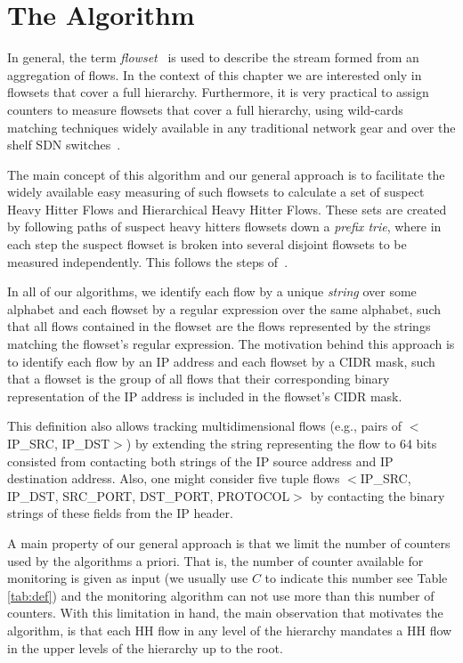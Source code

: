 \section{The \simpleAlgo Algorithm}

In general, the term \textit{flowset}~\cite{conf/sigcomm/YuanCM07} is used to describe the stream formed from an aggregation of flows.
In the context of this chapter we are interested only in flowsets that cover a full hierarchy.
Furthermore, it is very practical to assign counters to measure flowsets that cover a full hierarchy, using wild-cards matching techniques widely available in any traditional network gear and over the shelf SDN switches~\cite{OVS, OF1.5}.



The main concept of this algorithm and our general approach is to facilitate the widely available easy measuring of such flowsets to calculate a set of suspect Heavy Hitter Flows and Hierarchical Heavy Hitter Flows. These sets are created by following paths of suspect heavy hitters flowsets down a \textit{prefix trie}, where in each step the suspect flowset is broken into several disjoint flowsets to be measured independently. This follows the steps of~\cite{conf/sigcomm/YuanCM07,Moraney2016}.

In all of our algorithms, we identify each flow by a unique \textit{string} over some alphabet and each flowset by a regular expression over the same alphabet, such that all flows contained in the flowset are the flows represented by the strings matching the flowset's regular expression. The motivation behind this approach is to identify each flow by an IP address and each flowset by a CIDR mask, such that a flowset is the group of all flows that their corresponding binary representation of the IP address is included in the flowset's CIDR mask.

This definition also allows tracking multidimensional flows (e.g., pairs of $<$IP\_SRC, IP\_DST$>$) by extending the string representing the flow to 64 bits consisted from contacting both strings of the IP source address and IP destination address. Also, one might consider five tuple flows $<$IP\_SRC, IP\_DST, SRC\_PORT, DST\_PORT, PROTOCOL$>$ by contacting the binary strings of these fields from the IP header.

A main property of our general approach is that we limit the number of counters used by the algorithms a priori. That is, the number of counter available for monitoring is given as input (we usually use $C$ to indicate this number see Table \ref{tab:def}) and the monitoring algorithm can not use  more than this number of counters.
With this limitation in hand, the main observation that motivates the algorithm, is that each HH flow in any level of the hierarchy mandates a HH flow in the upper levels of the hierarchy up to the root.

